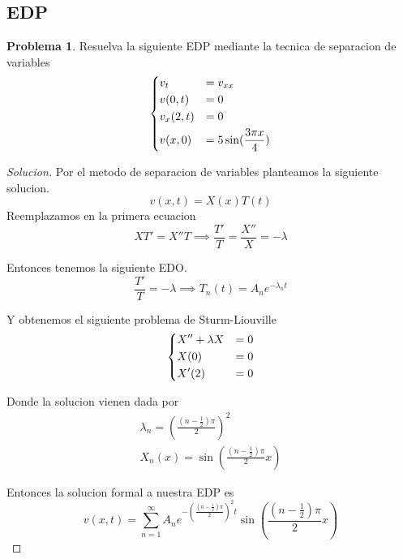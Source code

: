 \documentclass{article}
\theoremstyle{definition}
\newtheorem{problem}{Problema}
\newenvironment{solution}{\begin{proof}[Solucion]}{\end{proof}}
\begin{document}
\subsection{EDP}
\begin{problem}
  Resuelva la siguiente EDP mediante la tecnica de separacion de variables
  \begin{equation*}
    \begin{dcases}
      v_{t} &= v_{xx}\\
      v(0, t) &= 0\\
      v_{x}(2, t) &= 0\\
      v(x, 0) &= 5 \sin(\frac{3\pi x}{4})
    \end{dcases}
  \end{equation*}
\end{problem}
\begin{solution}
  Por el metodo de separacion de variables planteamos la siguiente solucion.
  \begin{equation*}
    v(x, t) = X(x)T(t)
  \end{equation*}
  Reemplazamos en la primera ecuacion
  \begin{equation*}
    XT' = X''T \implies \frac{T'}{T} = \frac{X''}{X} = - \lambda
  \end{equation*}

  Entonces tenemos la siguiente EDO.
  \begin{equation*}
    \frac{T'}{T} = -\lambda \implies T_{n}(t) = A_{n}e^{-\lambda_{n} t}
  \end{equation*}

  Y obtenemos el siguiente problema de Sturm-Liouville
  \begin{equation*}
    \begin{dcases}
      X'' + \lambda X &= 0\\
      X(0) &= 0\\
      X'(2) &= 0
    \end{dcases}
  \end{equation*}

  Donde la solucion vienen dada por
  \begin{gather*}
    \lambda_{n} = (\frac{(n - \frac12)\pi}{2})^{2}\\
    X_{n}(x) = \sin(\frac{(n - \frac12)\pi}{2} x)
  \end{gather*}

  Entonces la solucion formal a nuestra EDP es
  \begin{equation*}
    v(x, t) = \sum_{n = 1}^{\infty} A_{n}e^{-(\frac{(n - \frac12)\pi}{2})^{2} t} \sin(\frac{(n - \frac12)\pi}{2} x)
  \end{equation*}


\end{solution}
\end{document}
